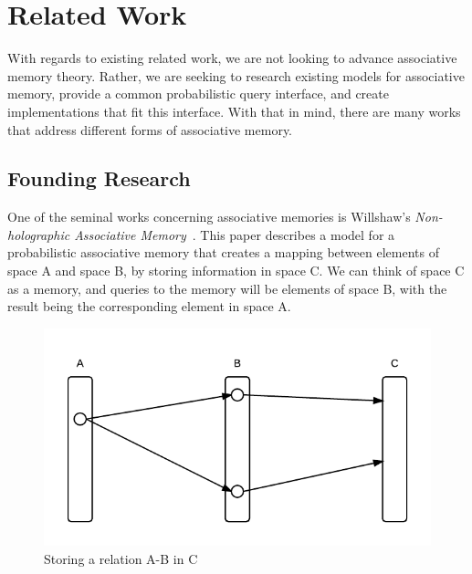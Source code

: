 \documentclass{sig-alternate}
\begin{document}

\section{Related Work}
\label{sec:related_work}

With regards to existing related work, we are not looking to
advance associative memory theory. Rather, we are seeking to research existing
models for associative memory, provide a common probabilistic query interface, and create 
implementations that fit this interface. With that in mind, there are many works that 
address different forms of associative memory. 

\subsection{Founding Research}
\label{subsec:founding}

One of the seminal works concerning associative memories is Willshaw's \textit{Non-holographic
Associative Memory}~\cite{holographic}. This paper describes a model for a probabilistic associative memory
that creates a mapping between elements of space A and space B, by storing information
in space C. We can think of space C as a memory, and queries to the memory will be elements
of space B, with the result being the corresponding element in space A.

\begin{figure}[H]
	\begin{center}
		\includegraphics[width=1\linewidth]{mapping}
	\end{center}
	\vspace{-12pt}
	\caption{Storing a relation A-B in C}
	\label{fig:mapping}
\end{figure}
\end{document}
